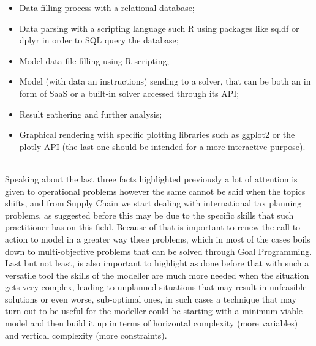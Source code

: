 \begin{doublespace}
\begin{itemize}
    \item Data filling process with a relational database;
    \item Data parsing with a scripting language such R using packages like sqldf\cite{Rsqldf_2017} or dplyr\cite{Rdplyr} in order to SQL query the database;
    \item Model data file filling using R scripting;
    \item Model (with data an instructions) sending to a solver, that can be both an in form of SaaS or a built-in solver accessed through its API;
    \item Result gathering and further analysis; 
    \item Graphical rendering with specific plotting libraries such as ggplot2\cite{Rggplot2_2009} or the plotly\cite{Rplotly_2017} API (the last one should be intended for a more interactive purpose).
\end{itemize}
\\
Speaking about the last three facts highlighted previously a lot of attention is given to operational problems however the same cannot be said when the topics shifts, and from Supply Chain we start dealing with international tax planning problems, as suggested before this may be due to the specific skills that such practitioner has on this field. Because of that is important to renew the call to action to model in a greater way these problems, which in most of the cases boils down to multi-objective problems that can be solved through Goal Programming.
\\
Last but not least, is also important to highlight as done before that with such a versatile tool the skills of the modeller are much more needed when the situation gets very complex, leading to unplanned situations that may result in unfeasible solutions or even worse, sub-optimal ones, in such cases a technique that may turn out to be useful for the modeller could be starting with a minimum viable model and then build it up in terms of horizontal complexity (more variables) and vertical complexity (more constraints).

\pagebreak

\end{doublespace}
